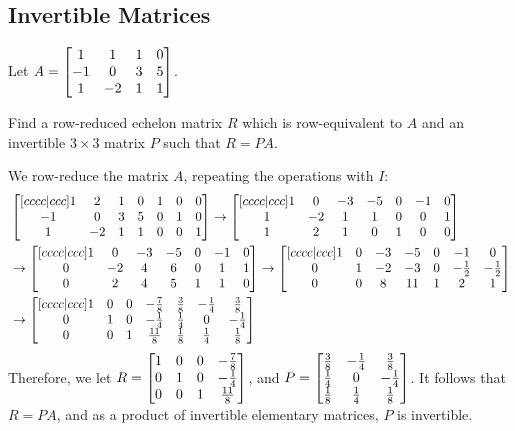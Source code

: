 \documentclass{agony}
\begin{document}


\subsection{Invertible Matrices}

\begin{xca}\label{xca:rpa}
  Let $A = \mqty[1&1&1&0 \\ -1&0&3&5 \\ 1&-2&1&1]$.

  Find a row-reduced echelon matrix $R$ which is row-equivalent to $A$
  and an invertible $3 \times 3$ matrix $P$ such that $R = PA$.
\end{xca}
\begin{sol}
  We row-reduce the matrix $A$, repeating the operations with $I$:
  \begin{equation*}
    \begin{split}
      & \bmqty[cccc|ccc]{1&2&1&0 & 1&0&0 \\ -1&0&3&5 & 0&1&0 \\ 1&-2&1&1 & 0&0&1}
      \to \bmqty[cccc|ccc]{1&0&-3&-5 & 0&-1&0 \\ 1&-2&1&1 & 0&0&1 \\ 1&2&1&0 & 1&0&0} \\
      & \to \bmqty[cccc|ccc]{1&0&-3&-5 & 0&-1&0 \\ 0&-2&4&6 & 0&1&1 \\ 0&2&4&5 & 1&1&0}
      \to \bmqty[cccc|ccc]{1&0&-3&-5 & 0&-1&0 \\ 0&1&-2&-3 & 0&-\frac12&-\frac12 \\ 0&0&8&11 & 1&2&1} \\
      & \to \bmqty[cccc|ccc]{1&0&0&-\frac78 & \frac38&-\frac14&\frac38 \\ 0&1&0&-\frac14 & \frac14&0&-\frac14 \\ 0&0&1&\frac{11}8 & \frac18&\frac14&\frac18}
    \end{split}
  \end{equation*}
  Therefore, we let $R = \mqty[\mqty{\imat{3}} & \mqty{-\frac78\\-\frac14\\\frac{11}8}]$,
  and $P = \mqty[\frac38&-\frac14&\frac38 \\ \frac14&0&-\frac14 \\ \frac18&\frac14&\frac18]$.
  It follows that $R = PA$, and as a product of invertible elementary matrices, $P$ is invertible.
\end{sol}
\end{document}
